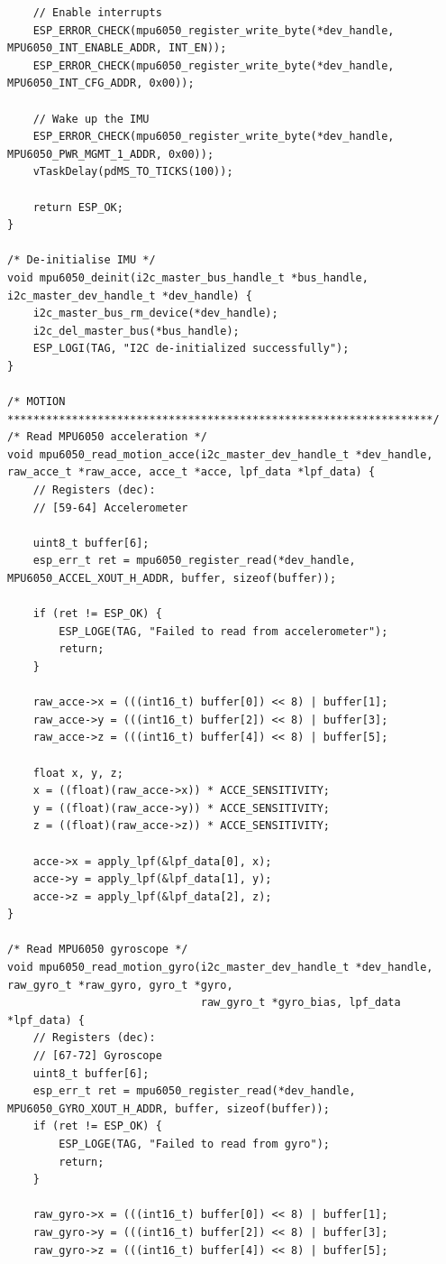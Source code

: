 \begin{lstlisting}
    // Enable interrupts
    ESP_ERROR_CHECK(mpu6050_register_write_byte(*dev_handle, MPU6050_INT_ENABLE_ADDR, INT_EN));
    ESP_ERROR_CHECK(mpu6050_register_write_byte(*dev_handle, MPU6050_INT_CFG_ADDR, 0x00));

    // Wake up the IMU
    ESP_ERROR_CHECK(mpu6050_register_write_byte(*dev_handle, MPU6050_PWR_MGMT_1_ADDR, 0x00));
    vTaskDelay(pdMS_TO_TICKS(100)); 

    return ESP_OK;
}

/* De-initialise IMU */
void mpu6050_deinit(i2c_master_bus_handle_t *bus_handle, i2c_master_dev_handle_t *dev_handle) {
    i2c_master_bus_rm_device(*dev_handle);
    i2c_del_master_bus(*bus_handle);
    ESP_LOGI(TAG, "I2C de-initialized successfully");
}

/* MOTION ******************************************************************/
/* Read MPU6050 acceleration */
void mpu6050_read_motion_acce(i2c_master_dev_handle_t *dev_handle, raw_acce_t *raw_acce, acce_t *acce, lpf_data *lpf_data) {
    // Registers (dec):
    // [59-64] Accelerometer

    uint8_t buffer[6];
    esp_err_t ret = mpu6050_register_read(*dev_handle, MPU6050_ACCEL_XOUT_H_ADDR, buffer, sizeof(buffer));

    if (ret != ESP_OK) {
        ESP_LOGE(TAG, "Failed to read from accelerometer");
        return;
    }
    
    raw_acce->x = (((int16_t) buffer[0]) << 8) | buffer[1];
    raw_acce->y = (((int16_t) buffer[2]) << 8) | buffer[3];
    raw_acce->z = (((int16_t) buffer[4]) << 8) | buffer[5];
    
    float x, y, z; 
    x = ((float)(raw_acce->x)) * ACCE_SENSITIVITY;
    y = ((float)(raw_acce->y)) * ACCE_SENSITIVITY;
    z = ((float)(raw_acce->z)) * ACCE_SENSITIVITY;

    acce->x = apply_lpf(&lpf_data[0], x);
    acce->y = apply_lpf(&lpf_data[1], y);
    acce->z = apply_lpf(&lpf_data[2], z);
}

/* Read MPU6050 gyroscope */
void mpu6050_read_motion_gyro(i2c_master_dev_handle_t *dev_handle, raw_gyro_t *raw_gyro, gyro_t *gyro,
                              raw_gyro_t *gyro_bias, lpf_data *lpf_data) {
    // Registers (dec):
    // [67-72] Gyroscope
    uint8_t buffer[6];
    esp_err_t ret = mpu6050_register_read(*dev_handle, MPU6050_GYRO_XOUT_H_ADDR, buffer, sizeof(buffer));
    if (ret != ESP_OK) {
        ESP_LOGE(TAG, "Failed to read from gyro");
        return;
    }

    raw_gyro->x = (((int16_t) buffer[0]) << 8) | buffer[1];
    raw_gyro->y = (((int16_t) buffer[2]) << 8) | buffer[3];
    raw_gyro->z = (((int16_t) buffer[4]) << 8) | buffer[5];
    

\end{lstlisting}

